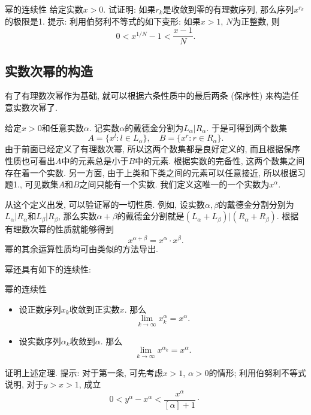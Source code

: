 \begin{exercise}{幂的连续性}
给定实数$x>0$. 试证明: 如果$r_k$是收敛到零的有理数序列, 那么序列$x^{r_k}$的极限是1. 提示: 利用伯努利不等式的如下变形: 如果$x>1$, $N$为正整数, 则
\[
0<x^{1/N}-1<\frac{x-1}{N}.
\]
\end{exercise}

\subsection{实数次幂的构造}
有了有理数次幂作为基础, 就可以根据六条性质中的最后两条 (保序性) 来构造任意实数次幂了. 

给定$x>0$和任意实数$\alpha$. 记实数$\alpha$的戴德金分割为$L_\alpha|R_\alpha$. 于是可得到两个数集
\[
A=\{x^l:l\in L_\alpha\},\quad B=\{x^r:r\in R_\alpha\}.
\]
由于前面已经定义了有理数次幂, 所以这两个数集都是良好定义的, 而且根据保序性质也可看出$A$中的元素总是小于$B$中的元素. 根据实数的完备性, 这两个数集之间存在着一个实数. 另一方面, 由于上类和下类之间的元素可以任意接近, 所以根据习题1., 可见数集$A$和$B$之间只能有一个实数. 我们定义这唯一的一个实数为$x^\alpha$.

从这个定义出发, 可以验证幂的一切性质. 例如, 设实数$\alpha,\beta$的戴德金分割分别为$L_\alpha|R_\alpha$和$L_\beta|R_\beta$, 那么实数$\alpha+\beta$的戴德金分割就是$(L_\alpha+L_\beta)|(R_\alpha+R_\beta)$. 根据有理数次幂的性质就能够得到
\[
x^{\alpha+\beta}=x^\alpha\cdot x^\beta.
\]
幂的其余运算性质均可由类似的方法导出.

幂还具有如下的连续性:

\begin{theorem}{幂的连续性}
\begin{itemize}
\item 设正数序列$x_k$收敛到正实数$x$. 那么
\[
\lim_{k\to\infty}x_k^\alpha=x^\alpha.
\]
\item 设实数序列$\alpha_k$收敛到$\alpha$. 那么
\[
\lim_{k\to\infty}x^{\alpha_k}=x^\alpha.
\]
\end{itemize}
\end{theorem}

\begin{exercise}{}
证明上述定理. 提示: 对于第一条, 可先考虑$x>1$, $\alpha>0$的情形; 利用伯努利不等式说明, 对于$y>x>1$, 成立
\[
0<y^\alpha-x^\alpha<\frac{x^\alpha}{[\alpha]+1}\cdot\frac{}{}
\]
\end{exercise}